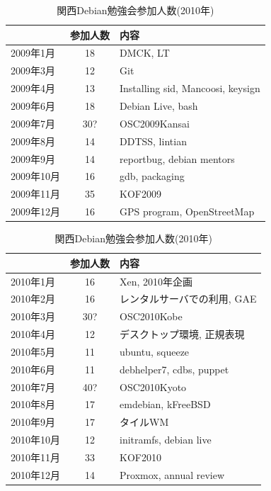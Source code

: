 \documentclass[mingoth,a4paper]{jsarticle}
\begin{document}
\begin{table}
\begin{minipage}{0.5\hsize}
\end{minipage}
\begin{minipage}{0.5\hsize}
 \caption{関西Debian勉強会参加人数(2009年)}\label{tab:count2009kansai}
 \begin{center}
  \begin{tabular}{|l|c|p{10em}|}
 \hline
 & 参加人数 & 内容 \\
 \hline
2009年1月 & 18 & DMCK, LT \\
2009年3月 & 12 & Git \\
2009年4月 & 13 & Installing sid, Mancoosi, keysign \\
2009年6月 & 18 & Debian Live, bash\\
2009年7月 & 30? & OSC2009Kansai \\
2009年8月 & 14 & DDTSS, lintian \\
2009年9月 & 14 & reportbug, debian mentors\\
2009年10月 & 16 & gdb, packaging \\
2009年11月 & 35 & KOF2009 \\
2009年12月 & 16 & GPS program, OpenStreetMap \\
 \hline
  \end{tabular}
 \end{center}
\end{minipage}
\begin{minipage}{0.5\hsize}
 \caption{関西Debian勉強会参加人数(2010年)}\label{tab:count2010kansai}
 \begin{center}
  \begin{tabular}{|l|c|p{10em}|}
 \hline
 & 参加人数 & 内容 \\
 \hline
2010年1月 & 16 & Xen, 2010年企画 \\
2010年2月 & 16 & レンタルサーバでの利用, GAE \\
2010年3月 & 30? & OSC2010Kobe \\
2010年4月 & 12 & デスクトップ環境, 正規表現 \\
2010年5月 & 11 & ubuntu, squeeze \\
2010年6月 & 11 & debhelper7, cdbs, puppet \\
2010年7月 & 40? & OSC2010Kyoto \\
2010年8月 & 17 & emdebian, kFreeBSD \\
2010年9月 & 17 & タイルWM \\
2010年10月 & 12 & initramfs, debian live \\
2010年11月 & 33 & KOF2010 \\
2010年12月 & 14 & Proxmox, annual review \\
 \hline
  \end{tabular}
 \end{center}
\end{minipage}
\end{table}
\end{document}

